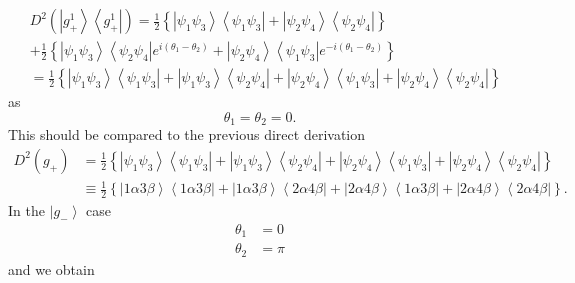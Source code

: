 \documentclass[aps,preprint]{revtex4}%
\begin{document}
\begin{align*}
&  D^{2}\left(  \left\vert g_{+}^{1}\right\rangle \left\langle g_{+}%
^{1}\right\vert \right)  =\frac{1}{2}\left\{  \left\vert \psi_{1}\psi
_{3}\right\rangle \left\langle \psi_{1}\psi_{3}\right\vert +\left\vert
\psi_{2}\psi_{4}\right\rangle \left\langle \psi_{2}\psi_{4}\right\vert
\right\} \\
&  +\frac{1}{2}\left\{  \left\vert \psi_{1}\psi_{3}\right\rangle \left\langle
\psi_{2}\psi_{4}\right\vert e^{i\left(  \theta_{1}-\theta_{2}\right)
}+\left\vert \psi_{2}\psi_{4}\right\rangle \left\langle \psi_{1}\psi
_{3}\right\vert e^{-i\left(  \theta_{1}-\theta_{2}\right)  }\right\} \\
&  =\frac{1}{2}\left\{  \left\vert \psi_{1}\psi_{3}\right\rangle \left\langle
\psi_{1}\psi_{3}\right\vert +\left\vert \psi_{1}\psi_{3}\right\rangle
\left\langle \psi_{2}\psi_{4}\right\vert +\left\vert \psi_{2}\psi
_{4}\right\rangle \left\langle \psi_{1}\psi_{3}\right\vert +\left\vert
\psi_{2}\psi_{4}\right\rangle \left\langle \psi_{2}\psi_{4}\right\vert
\right\}
\end{align*}
as
\[
\theta_{1}=\theta_{2}=0.
\]
This should be compared to the previous direct derivation%
\begin{align}
D^{2}\left(  g_{+}\right)   &  =\frac{1}{2}\left\{  \left\vert \psi_{1}%
\psi_{3}\right\rangle \left\langle \psi_{1}\psi_{3}\right\vert +\left\vert
\psi_{1}\psi_{3}\right\rangle \left\langle \psi_{2}\psi_{4}\right\vert
+\left\vert \psi_{2}\psi_{4}\right\rangle \left\langle \psi_{1}\psi
_{3}\right\vert +\left\vert \psi_{2}\psi_{4}\right\rangle \left\langle
\psi_{2}\psi_{4}\right\vert \right\} \nonumber\\
&  \equiv\frac{1}{2}\left\{  \left\vert 1\alpha3\beta\right\rangle
\left\langle 1\alpha3\beta\right\vert +\left\vert 1\alpha3\beta\right\rangle
\left\langle 2\alpha4\beta\right\vert +\left\vert 2\alpha4\beta\right\rangle
\left\langle 1\alpha3\beta\right\vert +\left\vert 2\alpha4\beta\right\rangle
\left\langle 2\alpha4\beta\right\vert \right\}  .
\end{align}
In the $\left\vert g_{-}\right\rangle $ case
\begin{align*}
\theta_{1}  &  =0\\
\theta_{2}  &  =\pi
\end{align*}
and we obtain
\end{document}
